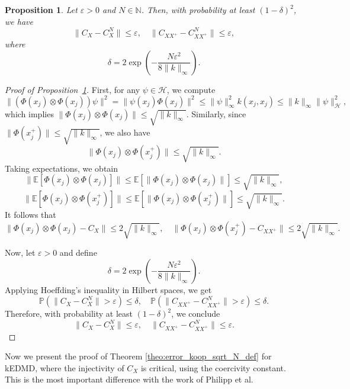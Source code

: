 \documentclass{article}
\newcommand{\E}{\mathbb{E}} %
\newtheorem{prop}{Proposition}
\renewcommand{\H}{\mathcal{H}}
\begin{document}
\begin{prop}
\label{prop:app_covariances}
Let \( \varepsilon > 0 \) and \( N \in \mathbb{N} \). Then, with probability at least \( (1 - \delta)^2 \), we have
\[
\| C_{X} - C_{X}^N \| \leq \varepsilon, \quad \| C_{XX^+} - C_{XX^+}^N \| \leq \varepsilon,
\]
where
\[
\delta = 2 \exp\left( -\frac{N \varepsilon^2}{8 \| k \|_\infty} \right).
\]
\end{prop}

\begin{proof}[Proof of Proposition~\ref{prop:app_covariances}]
First, for any \( \psi \in \H \), we compute
\[
\| (\Phi(x_j) \otimes \Phi(x_j)) \psi \|^2 = \| \psi(x_j) \Phi(x_j) \|^2 \leq \| \psi \|_\infty^2 k(x_j, x_j) \leq \| k \|_\infty \| \psi \|_\H^2,
\]
which implies \( \| \Phi(x_j) \otimes \Phi(x_j) \| \leq \sqrt{ \| k \|_\infty } \). Similarly, since \( \| \Phi(x_j^+) \| \leq \sqrt{ \| k \|_\infty } \), we also have
\[
\| \Phi(x_j) \otimes \Phi(x_j^+) \| \leq \sqrt{ \| k \|_\infty }.
\]
Taking expectations, we obtain
\[
\| \E[ \Phi(x_j) \otimes \Phi(x_j) ] \| \leq \E[ \| \Phi(x_j) \otimes \Phi(x_j) \| ] \leq \sqrt{ \| k \|_\infty },
\]
\[
\| \E[ \Phi(x_j) \otimes \Phi(x_j^+) ] \| \leq \E[ \| \Phi(x_j) \otimes \Phi(x_j^+) \| ] \leq \sqrt{ \| k \|_\infty }.
\]
It follows that
\[
\| \Phi(x_j) \otimes \Phi(x_j) - C_X \| \leq 2 \sqrt{ \| k \|_\infty }, \quad \| \Phi(x_j) \otimes \Phi(x_j^+) - C_{XX^+} \| \leq 2 \sqrt{ \| k \|_\infty }.
\]

Now, let \( \varepsilon > 0 \) and define
\[
\delta = 2 \exp\left( -\frac{N \varepsilon^2}{8 \| k \|_\infty} \right).
\]
Applying Hoeffding's inequality in Hilbert spaces, we get
\[
\mathbb{P}\left( \| C_X - C_X^N \| > \varepsilon \right) \leq \delta, \quad 
\mathbb{P}\left( \| C_{XX^+} - C_{XX^+}^N \| > \varepsilon \right) \leq \delta.
\]
Therefore, with probability at least \( (1 - \delta)^2 \), we conclude
\[
\| C_X - C_X^N \| \leq \varepsilon, \quad \| C_{XX^+} - C_{XX^+}^N \| \leq \varepsilon.
\]
\end{proof}

Now we present the proof of Theorem \ref{theo:error_koop_sqrt_N_def} for kEDMD, where the injectivity of $C_X$ is critical, using the coercivity constant. This is the most important difference with the work of Philipp et al.  
\end{document}
